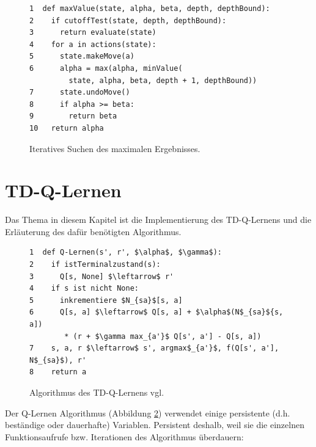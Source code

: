 \begin{figure}[!htbp]
\centering
\begin{lstlisting}[frame=single, mathescape=true]
1  def maxValue(state, alpha, beta, depth, depthBound):
2    if cutoffTest(state, depth, depthBound):
3      return evaluate(state)
4    for a in actions(state):
5      state.makeMove(a)
6      alpha = max(alpha, minValue(
         state, alpha, beta, depth + 1, depthBound))
7      state.undoMove()
8      if alpha >= beta:
9        return beta
10   return alpha
\end{lstlisting}
\caption{Iteratives Suchen des maximalen Ergebnisses.}
\label{fig:Iteratives Suchen des maximalen Ergebnisses}
\end{figure} 

\section{TD-Q-Lernen}
Das Thema in diesem Kapitel ist die Implementierung des TD-Q-Lernens und die Erläuterung des dafür benötigten Algorithmus. \\

\begin{figure}[!htbp]
\centering
\begin{lstlisting}[frame=single, mathescape=true]
1  def Q-Lernen(s', r', $\alpha$, $\gamma$):
2    if istTerminalzustand(s):
3      Q[s, None] $\leftarrow$ r'
4    if s ist nicht None:
5      inkrementiere $N_{sa}$[s, a]
6      Q[s, a] $\leftarrow$ Q[s, a] + $\alpha$(N$_{sa}${s, a])
  		* (r + $\gamma max_{a'}$ Q[s', a'] - Q[s, a])
7    s, a, r $\leftarrow$ s', argmax$_{a'}$, f(Q[s', a'], N$_{sa}$), r'
8    return a
\end{lstlisting}
\caption{Algorithmus des TD-Q-Lernens vgl. \cite[974]{Russell}}
\label{fig:TD-Q-Lernen Algorithmus}
\end{figure} 

Der Q-Lernen Algorithmus (Abbildung \ref{fig:TD-Q-Lernen Algorithmus}) verwendet einige persistente (d.h. beständige oder dauerhafte) Variablen. Persistent deshalb, weil sie die einzelnen Funktionsaufrufe bzw. Iterationen des Algorithmus überdauern:
 
